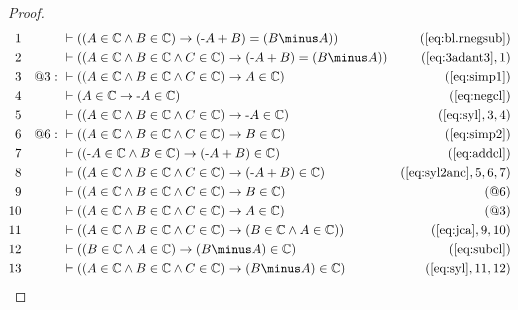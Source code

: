 \begin{proof}
\begin{align}
  1 &&  & \vdash ( ( A \in \mathbb{C} \wedge B \in \mathbb{C} ) \rightarrow ( \textrm{-} A + B ) = ( B \minus A ) )&(\mbox{\ref{eq:bl.rnegsub}})\notag
  \\ 2 &&  & \vdash ( ( A \in \mathbb{C} \wedge B \in \mathbb{C} \wedge C \in \mathbb{C} ) \rightarrow ( \textrm{-} A + B ) = ( B \minus A ) )&(\mbox{\ref{eq:3adant3}},1)\notag
  \\ 3 && @3:\  & \vdash ( ( A \in \mathbb{C} \wedge B \in \mathbb{C} \wedge C \in \mathbb{C} ) \rightarrow A \in \mathbb{C} )&(\mbox{\ref{eq:simp1}})\notag
  \\ 4 &&  & \vdash ( A \in \mathbb{C} \rightarrow \textrm{-} A \in \mathbb{C} )&(\mbox{\ref{eq:negcl}})\notag
  \\ 5 &&  & \vdash ( ( A \in \mathbb{C} \wedge B \in \mathbb{C} \wedge C \in \mathbb{C} ) \rightarrow \textrm{-} A \in \mathbb{C} )&(\mbox{\ref{eq:syl}},3,4)\notag
  \\ 6 && @6:\  & \vdash ( ( A \in \mathbb{C} \wedge B \in \mathbb{C} \wedge C \in \mathbb{C} ) \rightarrow B \in \mathbb{C} )&(\mbox{\ref{eq:simp2}})\notag
  \\ 7 &&  & \vdash ( ( \textrm{-} A \in \mathbb{C} \wedge B \in \mathbb{C} ) \rightarrow ( \textrm{-} A + B ) \in \mathbb{C} )&(\mbox{\ref{eq:addcl}})\notag
  \\ 8 &&  & \vdash ( ( A \in \mathbb{C} \wedge B \in \mathbb{C} \wedge C \in \mathbb{C} ) \rightarrow ( \textrm{-} A + B ) \in \mathbb{C} )&(\mbox{\ref{eq:syl2anc}},5,6,7)\notag
  \\ 9 &&  & \vdash ( ( A \in \mathbb{C} \wedge B \in \mathbb{C} \wedge C \in \mathbb{C} ) \rightarrow B \in \mathbb{C} )&(@6)\notag
  \\ 10 &&  & \vdash ( ( A \in \mathbb{C} \wedge B \in \mathbb{C} \wedge C \in \mathbb{C} ) \rightarrow A \in \mathbb{C} )&(@3)\notag
  \\ 11 &&  & \vdash ( ( A \in \mathbb{C} \wedge B \in \mathbb{C} \wedge C \in \mathbb{C} ) \rightarrow ( B \in \mathbb{C} \wedge A \in \mathbb{C} ) )&(\mbox{\ref{eq:jca}},9,10)\notag
  \\ 12 &&  & \vdash ( ( B \in \mathbb{C} \wedge A \in \mathbb{C} ) \rightarrow ( B \minus A ) \in \mathbb{C} )&(\mbox{\ref{eq:subcl}})\notag
  \\ 13 &&  & \vdash ( ( A \in \mathbb{C} \wedge B \in \mathbb{C} \wedge C \in \mathbb{C} ) \rightarrow ( B \minus A ) \in \mathbb{C} )&(\mbox{\ref{eq:syl}},11,12)\notag

\end{align}
\end{proof}
